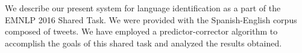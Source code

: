 We describe our present system for language identification as a part of the EMNLP 2016 Shared Task. We were provided with the Spanish-English corpus composed of tweets. We have employed a predictor-corrector algorithm to accomplish the goals of this shared task and analyzed the results obtained.
